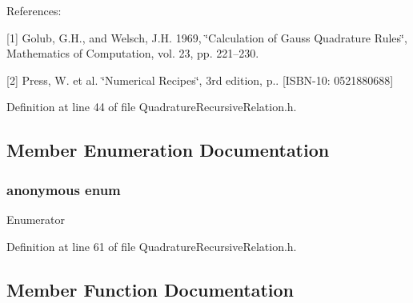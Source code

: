 References\+:
\begin{DoxyItemize}
\item \mbox{[}1\mbox{]} Golub, G.\+H., and Welsch, J.\+H. 1969, \char`\"{}\+Calculation of Gauss Quadrature Rules\char`\"{}, Mathematics of Computation, vol. 23, pp. 221–230.
\item \mbox{[}2\mbox{]} Press, W. et al. \char`\"{}\+Numerical Recipes\char`\"{}, 3rd edition, p.. \mbox{[}I\+S\+B\+N-\/10\+: 0521880688\mbox{]} 
\end{DoxyItemize}

Definition at line 44 of file Quadrature\+Recursive\+Relation.\+h.



\subsection{Member Enumeration Documentation}
\hypertarget{classmodel_1_1_quadrature_recursive_relation_a92659c45357d429ddfab7687b7392128}{}\subsubsection[{anonymous enum}]{\setlength{\rightskip}{0pt plus 5cm}anonymous enum}\label{classmodel_1_1_quadrature_recursive_relation_a92659c45357d429ddfab7687b7392128}
\begin{Desc}
\item[Enumerator]\par
\begin{description}
\item[{\em 
\hypertarget{classmodel_1_1_quadrature_recursive_relation_a92659c45357d429ddfab7687b7392128a6e3c7acbeebe1261e0fd1f737a639a10}{}dim\label{classmodel_1_1_quadrature_recursive_relation_a92659c45357d429ddfab7687b7392128a6e3c7acbeebe1261e0fd1f737a639a10}
}]\end{description}
\end{Desc}


Definition at line 61 of file Quadrature\+Recursive\+Relation.\+h.



\subsection{Member Function Documentation}
\hypertarget{classmodel_1_1_quadrature_recursive_relation_a6f3bb9995de139df0a624ab11b357076}{}
